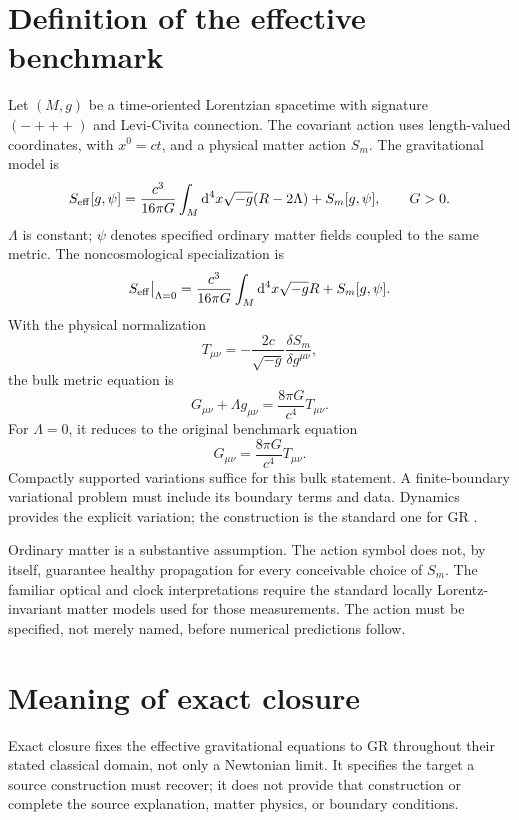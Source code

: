 \documentclass[11pt,oneside]{report}
\newcommand{\dd}{\mathrm d}
\theoremstyle{remark}
\numberwithin{definition}{chapter}
\numberwithin{proposition}{chapter}
\numberwithin{remark}{chapter}
\begin{document}
\section{Definition of the effective benchmark}
Let $(M,g)$ be a time-oriented Lorentzian spacetime with signature $(-+++)$ and Levi-Civita connection. The covariant action uses length-valued coordinates, with $x^0=ct$, and a physical matter action $S_m$. The gravitational model is
\begin{equation}
S_{\rm eff}[g,\psi]=\frac{c^3}{16\pi G}\int_M\dd^4x\sqrt{-g}(R-2\Lambda)
+S_m[g,\psi],\qquad G>0.
\label{exact_closure_note:eq:SA_lambda_note}
\end{equation}
$\Lambda$ is constant; $\psi$ denotes specified ordinary matter fields coupled to the same metric. The noncosmological specialization is
\begin{equation}
S_{\rm eff}\big|_{\Lambda=0}=\frac{c^3}{16\pi G}
\int_M\dd^4x\sqrt{-g}R+S_m[g,\psi].
\label{exact_closure_note:eq:SA}
\end{equation}
With the physical normalization
\begin{equation}
T_{\mu\nu}=-\frac{2c}{\sqrt{-g}}\frac{\delta S_m}{\delta g^{\mu\nu}},
\end{equation}
the bulk metric equation is
\begin{equation}
G_{\mu\nu}+\Lambda g_{\mu\nu}=\frac{8\pi G}{c^4}T_{\mu\nu}.
\label{exact_closure_note:eq:einstein_lambda_note}
\end{equation}
For $\Lambda=0$, it reduces to the original benchmark equation
\begin{equation}
G_{\mu\nu}=\frac{8\pi G}{c^4}T_{\mu\nu}.
\label{exact_closure_note:eq:einstein}
\end{equation}
Compactly supported variations suffice for this bulk statement. A finite-boundary variational problem must include its boundary terms and data. Dynamics provides the explicit variation; the construction is the standard one for GR \parencite{Carroll1997}.

Ordinary matter is a substantive assumption. The action symbol does not, by itself, guarantee healthy propagation for every conceivable choice of $S_m$. The familiar optical and clock interpretations require the standard locally Lorentz-invariant matter models used for those measurements. The action must be specified, not merely named, before numerical predictions follow.

\section{Meaning of exact closure}
Exact closure fixes the effective gravitational equations to GR throughout their stated classical domain, not only a Newtonian limit. It specifies the target a source construction must recover; it does not provide that construction or complete the source explanation, matter physics, or boundary conditions.
\end{document}
